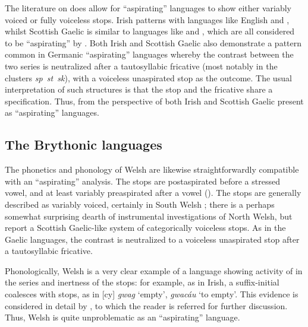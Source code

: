 \documentclass[output=paper,colorlinks,citecolor=brown]{langscibook}
\begin{document}
The literature on  does allow for \enquote{aspirating} languages to show either variably voiced or fully voiceless  stops. Irish patterns with languages like English and , whilst Scottish Gaelic is similar to languages like   and , which are all considered to be \enquote{aspirating} by \textcite{beckmanng:_empir}. Both Irish and Scottish Gaelic also demonstrate a pattern common in Germanic \enquote{aspirating} languages whereby the contrast between the two series is neutralized after a tautosyllabic fricative (most notably in the clusters \textit{sp~st~sk}), with a voiceless unaspirated stop as the outcome. The usual interpretation of such structures \parencite[e.\,g.][]{salmons2017germanic} is that the stop and the fricative share a  specification. Thus, from the perspective of  both Irish and Scottish Gaelic present as \enquote{aspirating} languages.

\subsection{The Brythonic languages}
\label{sec:welsh-cornish}

The phonetics and phonology of Welsh are likewise straightforwardly compatible with an \enquote{aspirating} analysis. The  stops are postaspirated before a stressed vowel, and at least variably preaspirated after a vowel (\cite{ball01:_welsh_phonet,jones,morris2017linguistic,iosad2020atr}). The  stops are generally described as variably voiced, certainly in South Welsh \parencite{jones}; there is a perhaps somewhat surprising dearth of instrumental investigations of North Welsh, but \textcite{bell2021northern} report a Scottish Gaelic\hyp like system of categorically voiceless  stops. As in the Gaelic languages, the contrast is neutralized to a voiceless unaspirated stop after a tautosyllabic  fricative.

Phonologically, Welsh is a very clear example of a language showing activity of  in the  series and inertness of the  stops: for example, as in Irish, a suffix\hyp initial  coalesces with  stops, as in [cy] \textit{gwag} `{empty}', \textit{gwacáu} `{to empty}'. This evidence is considered in detail by \textcite{iosad2020atr}, to which the reader is referred for further discussion. Thus, Welsh is quite unproblematic as an \enquote{aspirating} language.
\end{document}
